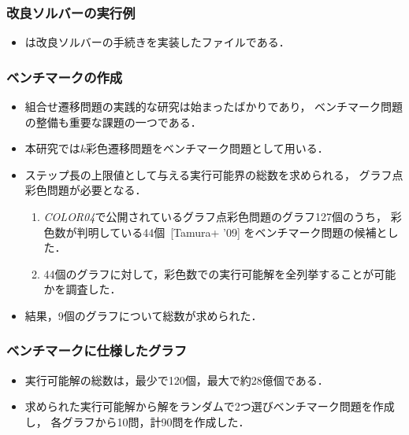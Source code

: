 \documentclass[dvipdfmx,11pt]{beamer}
\begin{document}
\begin{frame}\frametitle{改良ソルバーの実行例}

  \begin{exampleblock}{}
    \centering
    
  \end{exampleblock}

  \begin{itemize}
    \item {}は改良ソルバーの手続きを実装したファイルである．
  \end{itemize}

\end{frame}

\begin{frame}\frametitle{ベンチマークの作成}

  \begin{itemize}
    \item 組合せ遷移問題の実践的な研究は始まったばかりであり，
          ベンチマーク問題の整備も重要な課題の一つである．
    \item 本研究では$k$彩色遷移問題をベンチマーク問題として用いる．
    \item ステップ長の上限値として与える実行可能界の総数を求められる，
          グラフ点彩色問題が必要となる．
          \begin{enumerate}
            \item \textit{COLOR04}で公開されているグラフ点彩色問題のグラフ127個のうち，
                  彩色数が判明している44個~[Tamura+ '09] をベンチマーク問題の候補とした．
            \item 44個のグラフに対して，彩色数での実行可能解を全列挙することが可能
                  かを調査した．
          \end{enumerate}
    \item 結果，9個のグラフについて総数が求められた．
  \end{itemize}
  
\end{frame}

\begin{frame}\frametitle{ベンチマークに仕様したグラフ}

  \begin{exampleblock}{}
    \centering
    
  \end{exampleblock}

  \begin{itemize}
  \item 実行可能解の総数は，最少で120個，最大で約28億個である．
  \item 求められた実行可能解から解をランダムで2つ選びベンチマーク問題を作成し，
        各グラフから10問，計90問を作成した．
  \end{itemize}

\end{frame}
\end{document}
